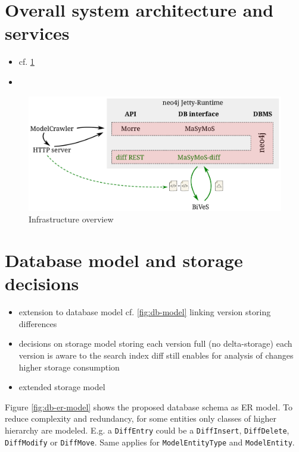 \section{Overall system architecture and services}
\begin{itemize}
	\item cf. \ref{fig:system-overview}
	\item {}
\end{itemize}

\begin{figure}[h]
	\centering
	\includegraphics[width=\textwidth]{resources/system-overview-matrix.pdf}
	\caption{Infrastructure overview}
	\label{fig:system-overview}
\end{figure}

\section{Database model and storage decisions}
\begin{itemize}
\item extension to database model cf. \ref{fig:db-model}
	\subitem linking version
	\subitem storing differences
\item decisions on storage model
	\subitem storing each version full (no delta-storage)
	\subitem each version is aware to the search index
	\subitem diff still enables for analysis of changes
	\subitem higher storage consumption
\item extended storage model
\end{itemize}

Figure \ref{fig:db-er-model} shows the proposed database schema as ER model. To reduce complexity and redundancy, for some entities only classes of higher hierarchy are modeled. E.g. a \texttt{DiffEntry} could be a \texttt{DiffInsert}, \texttt{DiffDelete}, \texttt{DiffModify} or \texttt{DiffMove}. Same applies for \texttt{ModelEntityType} and \texttt{ModelEntity}.

